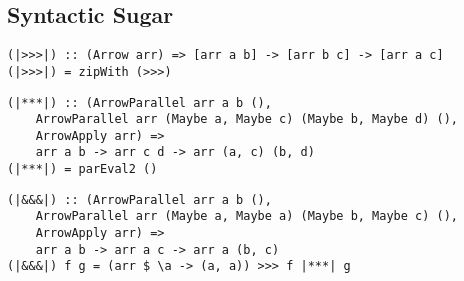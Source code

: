 \subsection{Syntactic Sugar}
\begin{frame}[fragile]
\begin{lstlisting}[frame=htrbl]
(|>>>|) :: (Arrow arr) => [arr a b] -> [arr b c] -> [arr a c]
(|>>>|) = zipWith (>>>)
\end{lstlisting}

\begin{lstlisting}[frame=htrbl]
(|***|) :: (ArrowParallel arr a b (),
	ArrowParallel arr (Maybe a, Maybe c) (Maybe b, Maybe d) (),
	ArrowApply arr) =>
	arr a b -> arr c d -> arr (a, c) (b, d)
(|***|) = parEval2 ()
\end{lstlisting}

\begin{lstlisting}[frame=htrbl]
(|&&&|) :: (ArrowParallel arr a b (),
	ArrowParallel arr (Maybe a, Maybe a) (Maybe b, Maybe c) (),
	ArrowApply arr) =>
	arr a b -> arr a c -> arr a (b, c)
(|&&&|) f g = (arr $ \a -> (a, a)) >>> f |***| g
\end{lstlisting}
\end{frame}